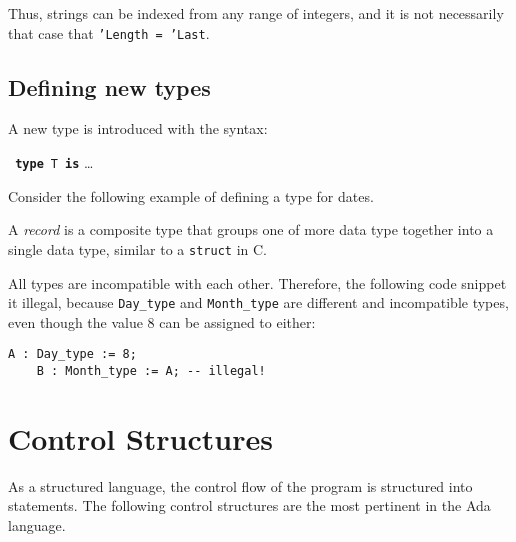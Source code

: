 Thus, strings can be indexed from any range of integers, and it is not necessarily that case that \texttt{'Length = 'Last}.


  \subsection{Defining new types}
  \label{sec:ada:defining-new-types}

  A new type is introduced with the syntax:

   \textbf{\texttt{ type}}~\texttt{T}~\textbf{\texttt{is}} \ldots


   Consider the following example of defining a type for dates.

  

  A \emph{record} is a composite type that groups one of more data type together into a single data type, similar to a \texttt{struct} in C.

  All types are incompatible with each other. Therefore, the following code snippet it illegal, because \texttt{Day\_type} and \texttt{Month\_type} are different and incompatible types, even though the  value 8 can be assigned to either:

  \begin{lstlisting}[caption={~}]
    A : Day_type := 8; 
    B : Month_type := A; -- illegal!
  \end{lstlisting}


  \section{Control Structures}

  As a structured language, the control flow of the program is structured into statements. The following control structures are the most pertinent in the Ada language.

